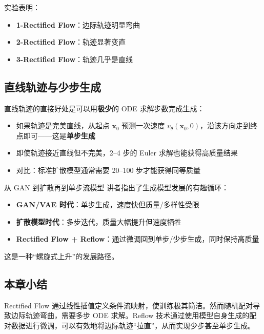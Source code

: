实验表明：
\begin{itemize}
    \item \textbf{1-Rectified Flow}：边际轨迹明显弯曲
    \item \textbf{2-Rectified Flow}：轨迹显著变直
    \item \textbf{3-Rectified Flow}：轨迹几乎是直线
\end{itemize}

\subsection{直线轨迹与少步生成}

直线轨迹的直接好处是可以用\textbf{极少}的 ODE 求解步数完成生成：

\begin{itemize}
    \item 如果轨迹是完美直线，从起点 $\mathbf{x}_0$ 预测一次速度 $v_\theta(\mathbf{x}_0, 0)$，沿该方向走到终点即可——这是\textbf{单步生成}
    \item 即使轨迹接近直线但不完美，2--4 步的 Euler 求解也能获得高质量结果
    \item 对比：标准扩散模型通常需要 20--100 步才能获得同等质量
\end{itemize}

\begin{knowledgebox}{从 GAN 到扩散再到单步流模型}
讲者指出了生成模型发展的有趣循环：
\begin{itemize}
    \item \textbf{GAN/VAE 时代}：单步生成，速度快但质量/多样性受限
    \item \textbf{扩散模型时代}：多步迭代，质量大幅提升但速度牺牲
    \item \textbf{Rectified Flow + Reflow}：通过微调回到单步/少步生成，同时保持高质量
\end{itemize}
这是一种``螺旋式上升''的发展路径。
\end{knowledgebox}

\subsection{本章小结}

Rectified Flow 通过线性插值定义条件流映射，使训练极其简洁。然而随机配对导致边际轨迹弯曲，需要多步 ODE 求解。Reflow 技术通过使用模型自身生成的配对数据进行微调，可以有效地将边际轨迹``拉直''，从而实现少步甚至单步生成。

